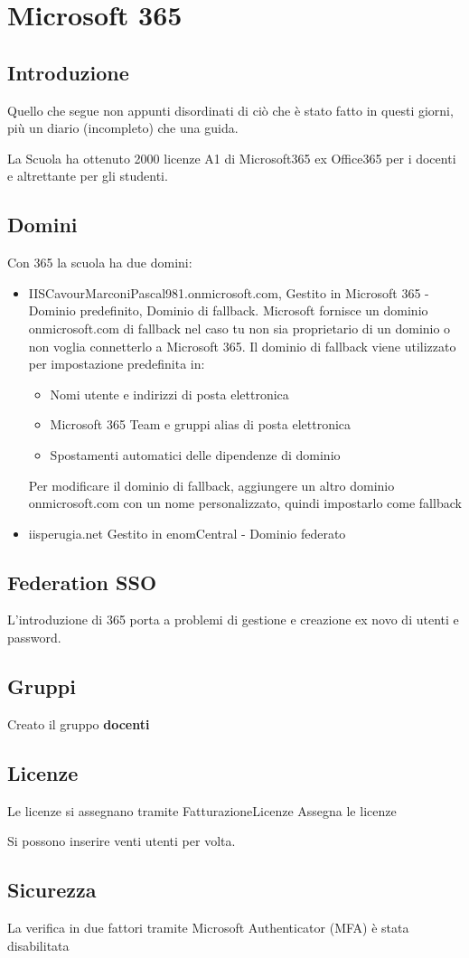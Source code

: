 \chapter{Microsoft 365}
\section{Introduzione}
Quello che segue non appunti disordinati di ciò che è stato fatto in questi giorni, più un diario (incompleto) che una guida.

La Scuola ha ottenuto 2000 licenze A1 di Microsoft365 ex Office365 per i docenti e altrettante per gli studenti.
\section{Domini}
Con 365 la scuola ha due domini:
\begin{itemize}
	\item IISCavourMarconiPascal981.onmicrosoft.com, ‎Gestito in ‎Microsoft 365‎‎ - ‎Dominio predefinito, Dominio di fallback‎. ‎Microsoft‎ fornisce un dominio ‎onmicrosoft.com‎ di fallback nel caso tu non sia proprietario di un dominio o non voglia connetterlo a ‎Microsoft 365‎. Il dominio di fallback viene utilizzato per impostazione predefinita in:
	\begin{itemize}
		\item Nomi utente e indirizzi di posta elettronica
		\item ‎Microsoft 365‎ Team e gruppi alias di posta elettronica
		\item Spostamenti automatici delle dipendenze di dominio
	\end{itemize}
	Per modificare il dominio di fallback, aggiungere un altro dominio ‎onmicrosoft.com‎ con un nome personalizzato, quindi impostarlo come fallback\cite{Microsoft2023}
	\item iisperugia.net ‎Gestito in ‎enomCentral‎‎ - ‎Dominio federato‎\cite[postnote]{Google2023h}
\end{itemize} 

\section{Federation SSO}
L'introduzione di 365 porta a problemi di gestione e creazione ex novo di utenti e password\cite{Google2023i}\cite{Goldy2020}.
\section{Gruppi}
Creato il gruppo \textbf{docenti}
\section{Licenze}
Le licenze si assegnano tramite Fatturazione\textrightarrow Licenze \textrightarrow Assegna le licenze 

Si possono inserire venti utenti per volta. 
\section{Sicurezza}
La verifica in due fattori tramite  Microsoft Authenticator (MFA) è stata disabilitata\cite{Microsoft2023a} 